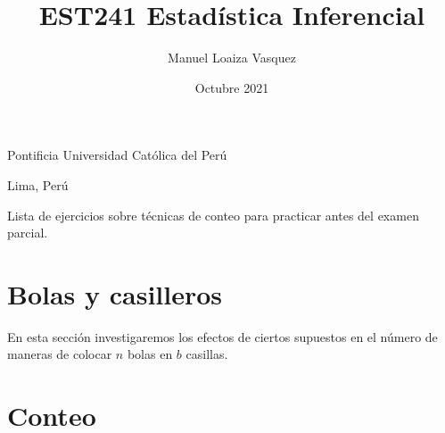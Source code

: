 \title{EST241 Estad\'istica Inferencial}
\author{Manuel Loaiza Vasquez}
\date{Octubre 2021}



\maketitle

\vspace*{-0.25in}
\centerline{Pontificia Universidad Cat\'olica del Per\'u}
\centerline{Lima, Per\'u}
\centerline{}
\vspace*{0.15in}

\begin{framed}
  Lista de ejercicios sobre t\'ecnicas de conteo para practicar antes del examen parcial.
\end{framed}

\section{Bolas y casilleros}

En esta secci\'on investigaremos los efectos de ciertos supuestos en el n\'umero de maneras
de colocar $n$ bolas en $b$ casillas.











\section{Conteo}








    






